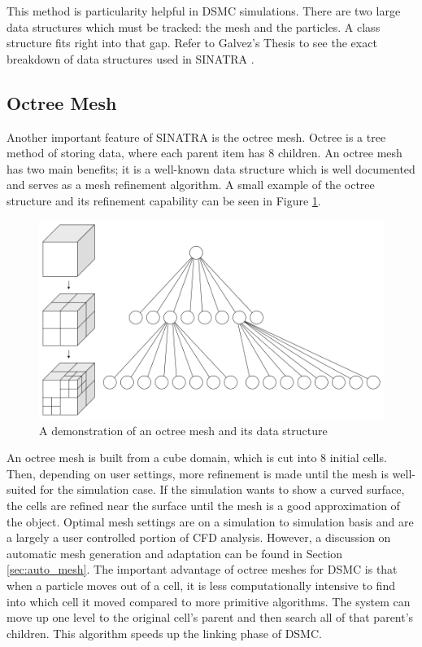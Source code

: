 \indent This method is particularity helpful in DSMC simulations. There are two large data structures which must be tracked: the mesh and the particles. A class structure fits right into that gap. Refer to Galvez's Thesis to see the exact breakdown of data structures used in SINATRA \cite{Galvez2018a}. \par

\subsection{Octree Mesh}
\label{sec:octree}

Another important feature of SINATRA is the octree mesh. Octree is a tree method of storing data, where each parent item has 8 children. An octree mesh has two main benefits; it is a well-known data structure which is well documented and serves as a mesh refinement algorithm. A small example of the octree structure and its refinement capability can be seen in Figure \ref{fig:octree}. \par


\begin{figure}
    \centering
    \includegraphics[width=.7\textwidth]{figures/octree.png}
    \caption[A demonstration of an octree mesh and its data structure]{A demonstration of an octree mesh and its data structure  \cite{octree}}
    \label{fig:octree}
\end{figure}


\indent An octree mesh is built from a cube domain, which is cut into 8 initial cells. Then, depending on user settings, more refinement is made until the mesh is well-suited for the simulation case. If the simulation wants to show a curved surface, the cells are refined near the surface until the mesh is a good approximation of the object. Optimal mesh settings are on a simulation to simulation basis and are a largely a user controlled portion of CFD analysis. However, a discussion on automatic mesh generation and adaptation can be found in Section \ref{sec:auto_mesh}. The important advantage of octree meshes for DSMC is that when a particle moves out of a cell, it is less computationally intensive to find into which cell it moved compared to more primitive algorithms. The system can move up one level to the original cell's parent and then search all of that parent's children. This algorithm speeds up the linking phase of DSMC. \par



